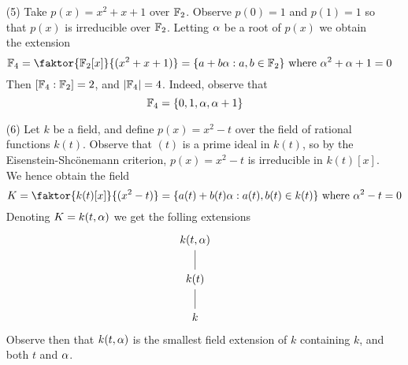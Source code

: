 \begin{example}
\begin{enumerate}
    \item[(5)] Take $p(x)=x^2+x+1$ over $\mathbb{F}_2$. Observe $p(0)=1$ and
      $p(1)=1$ so that $p(x)$ is irreducible over $\mathbb{F}_2$. Letting $\alpha$
      be a root of  $p(x)$ we obtain the extension
      \begin{equation*}
        \F_4=\faktor{\F_2[x]}{(x^2+x+1)}=\{a+b\a : a,b \in \F_2\}
        \text{ where } \a^2+\a+1=0
      \end{equation*}
      Then $[\mathbb{F}_4:\mathbb{F}_2]=2$, and $|\mathbb{F}_4|=4$. Indeed, observe that
      \begin{equation*}
        \mathbb{F}_4=\{0, 1, \alpha, \alpha+1\}
      \end{equation*}

    \item[(6)] Let $k$ be a field, and define $p(x)=x^2-t$ over the
      field of rational functions $k(t)$. Observe that $(t)$ is a
      prime ideal in $k(t)$, so by the Eisenstein-Shc\"onemann
      criterion, $p(x)=x^2-t$ is irreducible in $k(t)[x]$. We hence
      obtain the field
      \begin{equation*}
        K=\faktor{k(t)[x]}{(x^2-t)}=\{a(t)+b(t)\a : a(t),b(t) \in
        k(t)\} \text{ where }  \a^2-t=0
      \end{equation*}
      Denoting $K=k(t,\alpha)$ we get the folling extensions
      \[\begin{tikzcd}
        {k(t,\a)} \\
        {k(t)} \\
        k
        \arrow[no head, from=2-1, to=1-1]
        \arrow[no head, from=3-1, to=2-1]
      \end{tikzcd}\]
      Observe then that $k(t,\alpha)$ is the smallest field extension of
      $k$ containing $k$, and both $t$ and $\alpha$.
  \end{enumerate}
\end{example}


